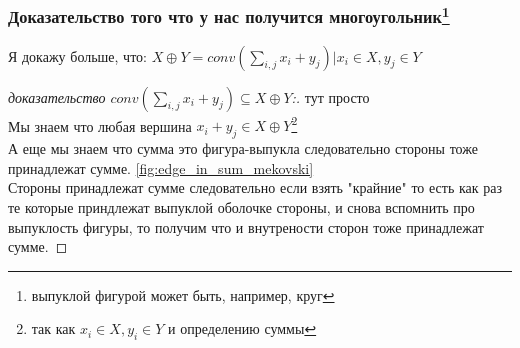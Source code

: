\documentclass{article}
\begin{document}
\subsubsection*{Доказательство того что у нас получится многоугольник\footnote{выпуклой фигурой может быть, например, круг}}
Я докажу больше, что: $X \oplus Y = conv(\sum_{i,j} x_i + y_j) | x_i \in X, y_j \in Y$\\
\begin{proof}[доказательство $conv(\sum_{i,j} x_i + y_j) \subseteq X \oplus Y$:] тут просто\\
    Мы знаем что любая вершина $x_i + y_j \in X \oplus Y$\footnote{так как $x_i \in X, y_i \in Y$ и определению суммы}\\
    А еще мы знаем что сумма это фигура-выпукла следовательно стороны тоже принадлежат сумме. \autoref{fig:edge_in_sum_mekovski}\\
    Стороны принадлежат сумме следовательно если взять "крайние" то есть как раз те которые приндлежат выпуклой оболочке стороны, и снова вспомнить про выпуклость фигуры, то получим что и внутрености сторон тоже принадлежат сумме.
\end{proof}
\end{document}
